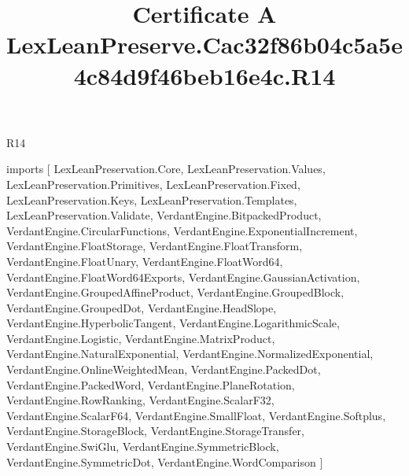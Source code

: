 \begin{lexlean}{R14}
\title{Certificate A LexLeanPreserve.Cac32f86b04c5a5e4c84d9f46beb16e4c.R14}
\begin{coremodule}
imports [
  LexLeanPreservation.Core,
  LexLeanPreservation.Values,
  LexLeanPreservation.Primitives,
  LexLeanPreservation.Fixed,
  LexLeanPreservation.Keys,
  LexLeanPreservation.Templates,
  LexLeanPreservation.Validate,
  VerdantEngine.BitpackedProduct,
  VerdantEngine.CircularFunctions,
  VerdantEngine.ExponentialIncrement,
  VerdantEngine.FloatStorage,
  VerdantEngine.FloatTransform,
  VerdantEngine.FloatUnary,
  VerdantEngine.FloatWord64,
  VerdantEngine.FloatWord64Exports,
  VerdantEngine.GaussianActivation,
  VerdantEngine.GroupedAffineProduct,
  VerdantEngine.GroupedBlock,
  VerdantEngine.GroupedDot,
  VerdantEngine.HeadSlope,
  VerdantEngine.HyperbolicTangent,
  VerdantEngine.LogarithmicScale,
  VerdantEngine.Logistic,
  VerdantEngine.MatrixProduct,
  VerdantEngine.NaturalExponential,
  VerdantEngine.NormalizedExponential,
  VerdantEngine.OnlineWeightedMean,
  VerdantEngine.PackedDot,
  VerdantEngine.PackedWord,
  VerdantEngine.PlaneRotation,
  VerdantEngine.RowRanking,
  VerdantEngine.ScalarF32,
  VerdantEngine.ScalarF64,
  VerdantEngine.SmallFloat,
  VerdantEngine.Softplus,
  VerdantEngine.StorageBlock,
  VerdantEngine.StorageTransfer,
  VerdantEngine.SwiGlu,
  VerdantEngine.SymmetricBlock,
  VerdantEngine.SymmetricDot,
  VerdantEngine.WordComparison
]


\end{coremodule}
\end{lexlean}
